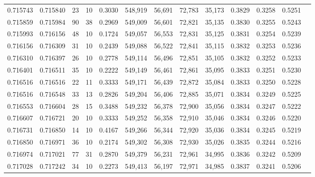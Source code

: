 \begin{tabular}{rrrrrrrrrrrrr}
0.715743 & 0.715840 &    23 &  10 &                                     0.3030 & 548,919 &  56,691 &  72,783 &  35,173 & 0.3829 & 0.3258 & 0.5251 \\
0.715859 & 0.715984 &    90 &  38 &                                     0.2969 & 549,009 &  56,601 &  72,821 &  35,135 & 0.3830 & 0.3255 & 0.5243 \\
0.715993 & 0.716156 &    48 &  10 &                                     0.1724 & 549,057 &  56,553 &  72,831 &  35,125 & 0.3831 & 0.3254 & 0.5239 \\
0.716156 & 0.716309 &    31 &  10 &                                     0.2439 & 549,088 &  56,522 &  72,841 &  35,115 & 0.3832 & 0.3253 & 0.5236 \\
0.716310 & 0.716397 &    26 &  10 &                                     0.2778 & 549,114 &  56,496 &  72,851 &  35,105 & 0.3832 & 0.3252 & 0.5233 \\
0.716401 & 0.716511 &    35 &  10 &                                     0.2222 & 549,149 &  56,461 &  72,861 &  35,095 & 0.3833 & 0.3251 & 0.5230 \\
0.716516 & 0.716516 &    22 &  11 &                                     0.3333 & 549,171 &  56,439 &  72,872 &  35,084 & 0.3833 & 0.3250 & 0.5228 \\
0.716516 & 0.716548 &    33 &  13 &                                     0.2826 & 549,204 &  56,406 &  72,885 &  35,071 & 0.3834 & 0.3249 & 0.5225 \\
0.716553 & 0.716604 &    28 &  15 &                                     0.3488 & 549,232 &  56,378 &  72,900 &  35,056 & 0.3834 & 0.3247 & 0.5222 \\
0.716607 & 0.716721 &    20 &  10 &                                     0.3333 & 549,252 &  56,358 &  72,910 &  35,046 & 0.3834 & 0.3246 & 0.5220 \\
0.716731 & 0.716850 &    14 &  10 &                                     0.4167 & 549,266 &  56,344 &  72,920 &  35,036 & 0.3834 & 0.3245 & 0.5219 \\
0.716850 & 0.716971 &    36 &  10 &                                     0.2174 & 549,302 &  56,308 &  72,930 &  35,026 & 0.3835 & 0.3244 & 0.5216 \\
0.716974 & 0.717021 &    77 &  31 &                                     0.2870 & 549,379 &  56,231 &  72,961 &  34,995 & 0.3836 & 0.3242 & 0.5209 \\
0.717028 & 0.717242 &    34 &  10 &                                     0.2273 & 549,413 &  56,197 &  72,971 &  34,985 & 0.3837 & 0.3241 & 0.5206 \\

\end{tabular}
